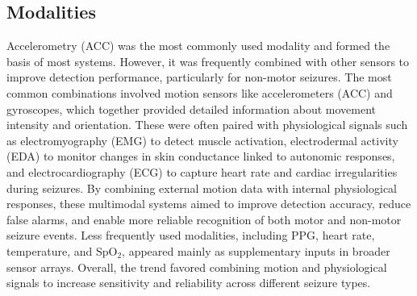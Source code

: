 \subsection{Modalities}

Accelerometry (ACC) was the most commonly used modality and formed the basis of most systems. However, it was frequently combined with other sensors to improve detection performance, particularly for non-motor seizures.
The most common combinations involved motion sensors like accelerometers (ACC) and gyroscopes, which together provided detailed information about movement intensity and orientation. These were often paired with physiological signals such as electromyography (EMG) to detect muscle activation, electrodermal activity (EDA) to monitor changes in skin conductance linked to autonomic responses, and electrocardiography (ECG) to capture heart rate and cardiac irregularities during seizures. By combining external motion data with internal physiological responses, these multimodal systems aimed to improve detection accuracy, reduce false alarms, and enable more reliable recognition of both motor and non-motor seizure events.
Less frequently used modalities, including PPG, heart rate, temperature, and SpO$_2$, appeared mainly as supplementary inputs in broader sensor arrays.
Overall, the trend favored combining motion and physiological signals to increase sensitivity and reliability across different seizure types.
